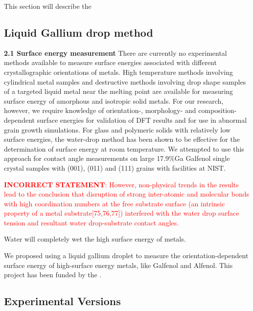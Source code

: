 This section will describe the 


\subsection{Liquid Gallium drop method}

\textbf{2.1 Surface energy measurement}
There are currently no experimental methods available to measure surface energies associated with different crystallographic orientations of metals. High temperature methods involving cylindrical metal samples and destructive methods involving drop shape samples of a targeted liquid metal near the melting point are available for measuring surface energy of amorphous and isotropic solid metals.\cite{Egry2010,Aqra2011,Cao2011} For our research, however, we require knowledge of orientation-, morphology- and composition-dependent surface energies for validation of DFT results and for use in abnormal grain growth simulations. For glass and polymeric solids with relatively low surface energies, the water-drop method has been shown to be effective for the determination of surface energy at room temperature.\cite{Ahadian2010,Kwok2000,Tavana2005} We attempted to use this approach for contact angle measurements on large 17.9$\%$Ga Galfenol single crystal samples with \hkl(001), \hkl(011) and \hkl(111) grains with facilities at NIST. 


\textcolor{red}{\textbf{INCORRECT STATEMENT}: However, non-physical trends in the results lead to the conclusion that disruption of strong inter-atomic and molecular bonds with high coordination numbers at the free substrate surface (an intrinsic property of a metal substrate[75,76,77]) interfered with the water drop surface tension and resultant water drop-substrate contact angles.}

Water will completely wet the high surface energy of metals.

We proposed using a liquid gallium droplet to measure the orientation-dependent surface energy of high-surface energy metals, like Galfenol and Alfenol. This project has been funded by the \NSF. 




\subsection{Experimental Versions}


